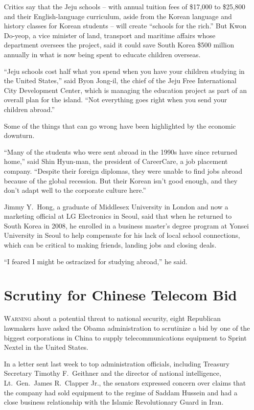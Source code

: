 ﻿\documentclass[12pt]{article}
\begin{document}
Critics say that the Jeju schools -- with annual tuition fees of \$17,000 to \$25,800 and their
English-language curriculum, aside from the Korean language and history classes for Korean students
-- will create ``schools for the rich.'' But Kwon Do-yeop, a vice minister of land, transport and
maritime affairs whose department oversees the project, said it could save South Korea \$500 million
annually in what is now being spent to educate children overseas.

``Jeju schools cost half what you spend when you have your children studying in the United States,''
said Byon Jong-il, the chief of the Jeju Free International City Development Center, which is
managing the education project as part of an overall plan for the island. ``Not everything goes
right when you send your children abroad.''

Some of the things that can go wrong have been highlighted by the economic downturn.

``Many of the students who were sent abroad in the 1990s have since returned home,'' said Shin
Hyun-man, the president of CareerCare, a job placement company. ``Despite their foreign diplomas,
they were unable to find jobs abroad because of the global recession. But their Korean isn't good
enough, and they don't adapt well to the corporate culture here.''

Jimmy Y.~Hong, a graduate of Middlesex University in London and now a marketing official at LG
Electronics in Seoul, said that when he returned to South Korea in 2008, he enrolled in a business
master's degree program at Yonsei University in Seoul to help compensate for his lack of local
school connections, which can be critical to making friends, landing jobs and closing deals.

``I feared I might be ostracized for studying abroad,'' he said.

\pagebreak
\section{Scrutiny for Chinese Telecom Bid}

\lettrine{W}{arning} about a potential threat to national security, eight
Republican lawmakers have asked the Obama administration to scrutinize a bid by one of the biggest
corporations in China to supply telecommunications equipment to Sprint Nextel in the United States.

In a letter sent last week to top administration officials, including Treasury Secretary Timothy
F.~Geithner and the director of national intelligence, Lt.~Gen.~James R.~Clapper Jr., the senators
expressed concern over claims that the company had sold equipment to the regime of Saddam Hussein
and had a close business relationship with the Islamic Revolutionary Guard in Iran.
\end{document}
